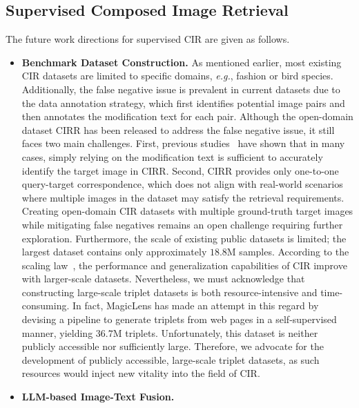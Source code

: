 \subsection{Supervised Composed Image Retrieval}
The future work directions for supervised CIR are given as follows.
\begin{itemize}
    \item \textbf{Benchmark Dataset Construction.} As mentioned earlier, most existing CIR datasets are limited to specific domains, \textit{e.g.}, fashion or bird species. Additionally, the false negative issue is prevalent in current datasets due to the data annotation strategy, which first identifies potential image pairs and then annotates the modification text for each pair. Although the open-domain dataset CIRR has been released to address the false negative issue, it still faces two main challenges. First, previous studies~\cite{pic2word,searle} have shown that in many cases, simply relying on the modification text is sufficient to accurately identify the target image in CIRR. Second, CIRR provides only one-to-one query-target correspondence, which does not align with real-world scenarios where multiple images in the dataset may satisfy the retrieval requirements. Creating open-domain CIR datasets with multiple ground-truth target images while mitigating false negatives remains an open challenge requiring further exploration. Furthermore, the scale of existing public datasets is limited; the largest dataset contains only approximately $18.8$M samples. According to the scaling law~\cite{scalinglaw}, the performance and generalization capabilities of CIR improve with larger-scale datasets.  Nevertheless, we must acknowledge that constructing large-scale triplet datasets is both resource-intensive and time-consuming. In fact, MagicLens has made an attempt in this regard by devising a pipeline to generate triplets from web pages in a self-supervised manner, yielding $36.7$M triplets. Unfortunately, this dataset is neither publicly accessible nor sufficiently large. Therefore, we advocate for the development of publicly accessible, large-scale triplet datasets, as such resources would inject new vitality into the field of CIR.
    \item \textbf{LLM-based Image-Text Fusion.} 

\end{itemize}
